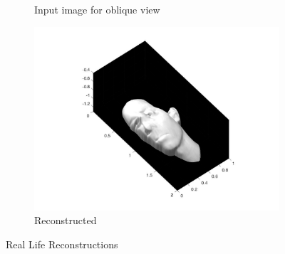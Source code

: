 \begin{center}
\begin{figure}
\begin{subfigure}{0.5\textwidth}
			\caption{Input image for oblique view}
		\end{subfigure}
		\begin{subfigure}{0.5\textwidth}
			\centering
			\includegraphics[scale = 0.2]{Images/realface/gleb_oblique.jpg}
			\caption{Reconstructed}
		\end{subfigure}
		\caption{Real Life Reconstructions}
		\label{fig:real}
	\end{figure}
\end{center}
 